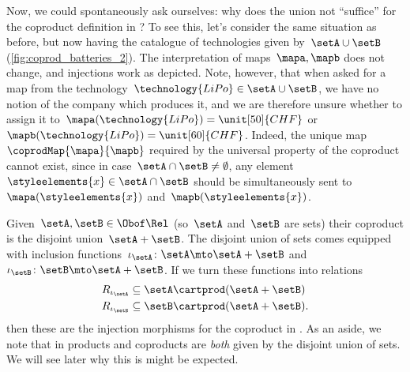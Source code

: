 \begin{example}
    Now, we could spontaneously ask ourselves: why does the union not ``suffice'' for the coproduct definition in \Set?
    To see this, let's consider the same situation as before, but now having the catalogue of technologies given by~$\setA\cup \setB$ (\cref{fig:coprod_batteries_2}).
    The interpretation of maps~$\mapa,\mapb$ does not change, and injections work as depicted.
    Note, however, that when asked for a map from the technology~$\technology{LiPo}\in \setA\cup \setB$, we have no notion of the company which produces it, and we are therefore unsure whether to assign it to~$\mapa(\technology{LiPo})=\unit[50]{CHF}$ or~$\mapb(\technology{LiPo})=\unit[60]{CHF}$.
    Indeed, the unique map~$\coprodMap{\mapa}{\mapb}$ required by the universal property of the coproduct cannot exist, since in case~$\setA\cap \setB\neq \emptyset$, any element~$\styleelements{x}\in \setA\cap \setB$ should be simultaneously sent to~$\mapa(\styleelements{x})$ and~$\mapb(\styleelements{x})$.

\end{example}


\begin{example}
    Given~$\setA,\setB\in \Obof\Rel$ (so~$\setA$ and~$\setB$ are sets) their coproduct is the disjoint union~$\setA+\setB$.
    The disjoint union of sets comes equipped with inclusion functions~$\iota_\setA\colon \setA\mto \setA+\setB$ and~$\iota_\setB\colon \setB\mto \setA+\setB$.
    If we turn these functions into relations
    \begin{equation*}
        \begin{aligned}
            R_{\iota_\setA} & \subseteq \setA\cartprod (\setA+\setB)  \\
            R_{\iota_\setB} & \subseteq \setB\cartprod (\setA+\setB).
        \end{aligned}
    \end{equation*}
    then these are the injection morphisms for the coproduct in \Rel.
    As an aside, we note that in \Rel products and coproducts are \emph{both} given by the disjoint union of sets.
    We will see later why this is might be expected.
\end{example}

